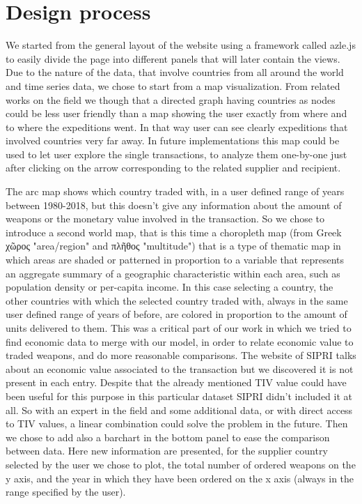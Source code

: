 \documentclass[twocolumn]{article}
\begin{document}
\section{Design process}
%

We started from the general layout of the website using a framework called azle.js to easily divide the page into different panels that will later contain the views.
Due to the nature of the data, that involve countries from all around the world and time series data, we chose to start from a map visualization.
From related works on the field we though that a directed graph having countries as nodes could be less user friendly than a map showing the user exactly from where and to where the expeditions went. In that way user can see clearly expeditions that involved countries very far away. In future implementations this map could be used to let user explore the single transactions, to analyze them one-by-one just after clicking on the arrow corresponding to the related supplier and recipient.

The arc map shows which country traded with, in a user defined range of years between 1980-2018, but this doesn’t give any information about the amount of weapons or the monetary value involved in the transaction. So we chose to introduce a second world map, that is this time a choropleth map (from Greek χῶρος "area/region" and πλῆθος "multitude") that is a type of thematic map in which areas are shaded or patterned in proportion to a variable that represents an aggregate summary of a geographic characteristic within each area, such as population density or per-capita income. In this case selecting a country, the other countries with which the selected country traded with, always in the same user defined range of years of before, are colored in proportion to the amount of units delivered  to them.
This was a critical part of our work in which we tried to find economic data to merge with our model, in order to relate economic value to traded weapons, and do more reasonable comparisons. The website of SIPRI talks about an economic value associated to the transaction but we discovered it is not present in each entry. Despite that the already mentioned TIV value could have been useful for this purpose in this particular dataset SIPRI didn’t included it at all. So with an expert in the field and some additional data, or with direct access to TIV values, a linear combination could solve the problem in the future.
Then we chose to add also a barchart in the bottom panel to ease the comparison between data. Here new information are presented, for the supplier country selected by the user we chose to plot, the total number of ordered weapons on the y axis, and the year in which they have been ordered on the x axis (always in the range specified by the user).
\end{document}
